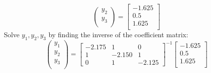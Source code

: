 \documentclass[10pt, a4paper]{article}
\begin{document}
\begin{tcolorbox}[title = \textbf{\huge Example}]
\[\begin{pmatrix}
    y_{2} \\
    y_{3} \\
    \end{pmatrix}
    =
    \begin{bmatrix}
    -1.625 \\
    0.5 \\
    1.625 \\
    \end{bmatrix}
    \]
Solve $y_{1}, y_{2}, y_{3}$ by finding the inverse of the coefficient matrix:
    \[
     \begin{pmatrix}
    y_{1} \\
    y_{2} \\
    y_{3} \\
    \end{pmatrix}
    =
    \begin{bmatrix}
    -2.175  &   1   &   0\\
    1   &   -2.150  &   1\\
    0   &   1   &   -2.125
    \end{bmatrix}^{-1}
    \begin{bmatrix}
    -1.625 \\
    0.5 \\
    1.625 \\
    \end{bmatrix}
    \]
    
\end{tcolorbox}
\end{document}
